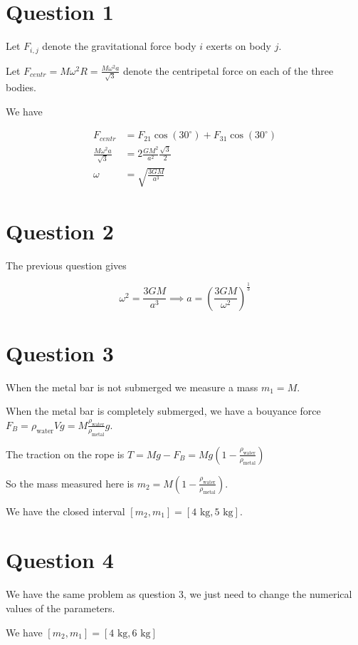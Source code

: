 \documentclass{article}
\begin{document}
\section*{Question 1}

Let $F_{i,j}$ denote the gravitational force body $i$ exerts on body $j$.

Let $F_{centr} = M \omega^2 R = \frac{M \omega^2 a}{\sqrt{3}}$ denote the centripetal force on each of the three bodies.

We have

\begin{align}
    F_{centr} &= F_{21}\cos(30^\circ) +  F_{31}\cos(30^\circ) \\
    \frac{M \omega^2 a}{\sqrt{3}} &= 2 \frac{G M^2}{a^2} \frac{\sqrt{3}}{2} \\
    \omega &= \sqrt{\frac{3GM}{a^3}}
\end{align}

\section*{Question 2}

The previous question gives

\begin{equation}
    \omega^2 = \frac{3GM}{a^3} \implies a = \left(\frac{3GM}{\omega^2}\right)^{\frac{1}{3}}
\end{equation}

\section*{Question 3}

When the metal bar is not submerged we measure a mass $m _1= M$.

When the metal bar is completely submerged, we have a bouyance force $F_B = \rho_{\text{water}}Vg = M\frac{ \rho_{\text{water}}}{\rho_{\text{metal}}}g$.

The traction on the rope is $T = Mg - F_B = Mg\left(1 - \frac{ \rho_{\text{water}}}{\rho_{\text{metal}}}\right)$

So the mass measured here is $m_2 = M\left(1 - \frac{ \rho_{\text{water}}}{\rho_{\text{metal}}} \right)$.

We have the closed interval $[m_2, m_1] = [4 \text{ kg}, 5 \text{ kg}]$.

\section*{Question 4}

We have the same problem as question 3, we just need to change the numerical values of the parameters.

We have  $[m_2, m_1] = [4 \text{ kg}, 6 \text{ kg}]$
\end{document}
